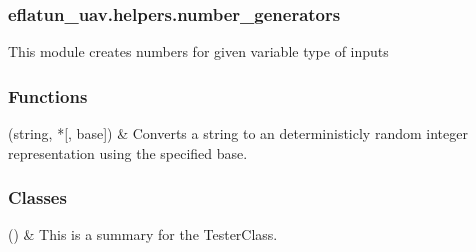 \documentclass[letterpaper,10pt,english]{sphinxmanual}
\begin{document}
\sphinxstepscope


\subsubsection{eflatun\_uav.helpers.number\_generators}
\label{\detokenize{generated/eflatun_uav.helpers.number_generators:module-eflatun_uav.helpers.number_generators}}\label{\detokenize{generated/eflatun_uav.helpers.number_generators:eflatun-uav-helpers-number-generators}}\label{\detokenize{generated/eflatun_uav.helpers.number_generators::doc}}
\sphinxAtStartPar
This module creates numbers for given variable type of inputs
\subsubsection*{Functions}


\begin{savenotes}\sphinxattablestart
\sphinxthistablewithglobalstyle
\sphinxthistablewithnovlinesstyle
\centering
\begin{tabulary}{\linewidth}[t]{}
\sphinxtoprule
\sphinxtableatstartofbodyhook
\sphinxAtStartPar
{\hyperref[\detokenize{generated/eflatun_uav.helpers.number_generators:eflatun_uav.helpers.number_generators.convert_string_to_int}]{}}(string, *{[}, base{]})
&
\sphinxAtStartPar
Converts a string to an deterministicly random integer representation using the specified base.
\\
\sphinxbottomrule
\end{tabulary}
\sphinxtableafterendhook\par
\sphinxattableend\end{savenotes}
\subsubsection*{Classes}


\begin{savenotes}\sphinxattablestart
\sphinxthistablewithglobalstyle
\sphinxthistablewithnovlinesstyle
\centering
\begin{tabulary}{\linewidth}[t]{}
\sphinxtoprule
\sphinxtableatstartofbodyhook
\sphinxAtStartPar
{\hyperref[\detokenize{generated/eflatun_uav.helpers.number_generators:eflatun_uav.helpers.number_generators.TesterClass}]{}}()
&
\sphinxAtStartPar
This is a summary for the TesterClass.
\\
\sphinxbottomrule
\end{tabulary}
\sphinxtableafterendhook\par
\sphinxattableend\end{savenotes}
\end{document}
